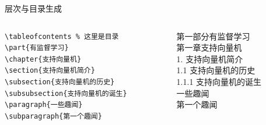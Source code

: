 \begin{frame}[fragile]{层次与目录生成}
\begin{columns}
\begin{column}{.6\textwidth}

\begin{lstlisting}[basicstyle=\ttfamily\small]
\tableofcontents % 这里是目录
\part{有监督学习}
\chapter{支持向量机}
\section{支持向量机简介}
\subsection{支持向量机的历史}
\subsubsection{支持向量机的诞生}
\paragraph{一些趣闻}
\subparagraph{第一个趣闻}
\end{lstlisting}
\end{column}
\begin{column}{.4\textwidth}
第一部分\quad 有监督学习\\
第一章\quad 支持向量机 \\
1. 支持向量机简介 \\
1.1 支持向量机的历史 \\
1.1.1 支持向量机的诞生 \\
一些趣闻  \\
第一个趣闻
\end{column}
\end{columns}

\end{frame}


